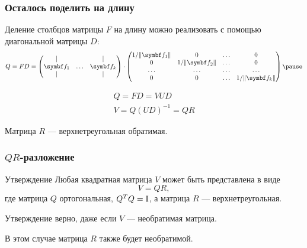 \begin{frame}
    \frametitle{Осталось поделить на длину}

    Деление столбцов матрицы $F$ на длину можно реализовать с помощью диагональной матрицы $D$: \pause
    \[
    Q = F D  = \begin{pmatrix}
        \vert &  & \vert \\
        \bff_1 & \ldots & \bff_k \\
        \vert &  & \vert \\
    \end{pmatrix}  \cdot \begin{pmatrix}
        1/ \norm{\bff_1} & 0 & \ldots & 0 \\
0 & 1/ \norm{\bff_2} & \ldots & 0 \\
\ldots & \ldots & \ldots & \ldots \\
0 & 0 & \ldots & 1/ \norm{\bff_k} \\
    \end{pmatrix} \pause
    \]

    \[
    \begin{array}{l}
    Q = FD = VUD \\
    V = Q(UD)^{-1} = QR
    \end{array}
    \]
    
    Матрица $R$ — верхнетреугольная обратимая.


\end{frame}


\begin{frame}
    \frametitle{$QR$-разложение}

    \begin{block}{Утверждение}
        Любая квадратная матрица $V$ может быть представлена в виде
        \[
        V = QR, 
        \]
        где матрица $Q$ ортогональная, $Q^T Q= \mathrm{I}$, а матрица $R$ — верхнетреугольная. \pause
    \end{block}
    
    Утверждение верно, даже если $V$ — необратимая матрица.

    В этом случае матрица $R$ также будет необратимой.

\end{frame}